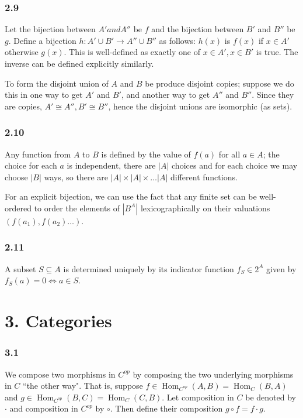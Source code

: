 \documentclass{article}
\DeclareMathOperator{\Hom}{Hom}
\begin{document}
\subsubsection*{2.9}

Let the bijection between $A' and A''$ be $f$ and the bijection between $B'$ and $B''$ be $g$. Define a bijection $h: A' \cup B' \to A'' \cup B''$ as follows: $h(x)$ is $f(x)$ if $x \in A'$ otherwise $g(x)$. This is well-defined as exactly one of $x \in A', x \in B'$ is true. The inverse can be defined explicitly similarly.

To form the disjoint union of $A$ and $B$ be produce disjoint copies; suppose we do this in one way to get $A'$ and $B'$, and another way to get $A''$ and $B''$. Since they are copies, $A' \cong A'', B' \cong B''$, hence the disjoint unions are isomorphic (as sets).

\subsubsection*{2.10}

Any function from $A$ to $B$ is defined by the value of $f(a)$ for all $a \in A$; the choice for each $a$ is independent, there are $|A|$ choices and for each choice we may choose $|B|$ ways, so there are $|A| \times |A| \times \ldots |A|$ different functions.

For an explicit bijection, we can use the fact that any finite set can be well-ordered to order the elements of $|B^A|$ lexicographically on their valuations $(f(a_1), f(a_2) \ldots )$.

\subsubsection*{2.11}

A subset $S \subseteq A$ is determined uniquely by its indicator function $f_S \in 2^A$ given by $f_S(a) = 0 \iff a \in S$.

\section*{3. Categories}

\subsubsection*{3.1}

We compose two morphisms in $C^{op}$ by composing the two underlying morphisms in $C$ ``the other way". That is, suppose $f \in \Hom_{C^{op}}(A, B) = \Hom_C(B, A)$ and $g \in \Hom_{C^{op}}(B, C) = \Hom_C(C, B)$. Let composition in $C$ be denoted by $\cdot$ and composition in $C^{op}$ by $\circ$. Then define their composition $g \circ f = f \cdot g$.
\end{document}

